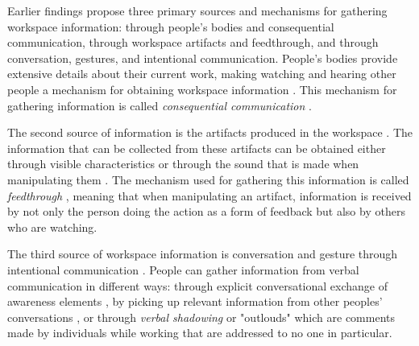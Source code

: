 \begin{table}[!ht]
\begin{tabular}{lll}
        \end{tabular}
        \vspace{1em}
        \label{tab:workspaceElementsPast}
    \end{table}


    Earlier findings \cite{segalEffectsChecklistInterface1994, normanThingsThatMake1993, dixHumanComputerInteraction2003, hutchinsTechnologyTeamNavigation1990, gutwinDescriptiveFrameworkWorkspace2002} propose three primary sources and mechanisms for gathering workspace information: through people's bodies and consequential communication, through workspace artifacts and feedthrough, and through conversation, gestures, and intentional communication. People's bodies provide extensive details about their current work, making watching and hearing other people a mechanism for obtaining workspace information \cite{gutwinDescriptiveFrameworkWorkspace2002, segalEffectsChecklistInterface1994}. This mechanism for gathering information is called \textit{consequential communication} \cite{segalEffectsChecklistInterface1994}.

    The second source of information is the artifacts produced in the workspace \cite{dixHumanComputerInteraction2003, gaverSoundSupportCollaboration1991}. The information that can be collected from these artifacts can be obtained either through visible characteristics \cite{gutwinDescriptiveFrameworkWorkspace2002} or through the sound that is made when manipulating them \cite{gaverSoundSupportCollaboration1991}. The mechanism used for gathering this information is called \textit{feedthrough} \cite{dixHumanComputerInteraction2003}, meaning that when manipulating an artifact, information is received by not only the person doing the action as a form of feedback but also by others who are watching.

    The third source of workspace information is conversation and gesture through intentional communication \cite{clarkUsingLanguage1996, heathUnpackingCollaborationInteractional1994, birdwhistellIntroductionKinesicsAnnotation1952}. People can gather information from verbal communication in different ways: through explicit conversational exchange of awareness elements \cite{gutwinDescriptiveFrameworkWorkspace2002}, by picking up relevant information from other peoples' conversations \cite{gutwinDescriptiveFrameworkWorkspace2002}, or through \textit{verbal shadowing} or "outlouds" \cite{heathUnpackingCollaborationInteractional1994} which are comments made by individuals while working that are addressed to no one in particular.

